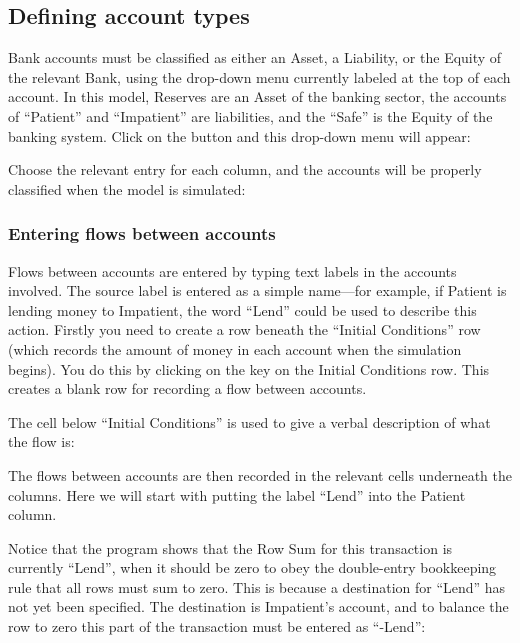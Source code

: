 \subsection{Defining account types}

Bank accounts must be classified as either an Asset, a Liability, or
the Equity of the relevant Bank, using the drop-down menu currently
labeled  at the top of each account. In
this model, Reserves are an Asset of the banking sector, the accounts
of ``Patient'' and ``Impatient'' are liabilities, and the ``Safe'' is
the Equity of the banking system. Click on the
 button and this drop-down menu will
appear:


Choose the relevant entry for each column, and the accounts will be properly classified when the model is simulated:


\subsubsection{Entering flows between accounts}


Flows between accounts are entered by typing text labels in the
accounts involved. The source label is entered as a simple name---for
example, if Patient is lending money to Impatient, the word ``Lend''
could be used to describe this action. Firstly you need to create a
row beneath the ``Initial Conditions'' row (which records the amount of
money in each account when the simulation begins). You do this by
clicking on the  key on the Initial Conditions row. This creates a
blank row for recording a flow between accounts.


The cell below ``Initial Conditions'' is used to give a verbal
description of what the flow is: 


The flows between accounts are then recorded in the relevant cells
underneath the columns. Here we will start with putting the label
``Lend'' into the Patient column. 


Notice that the program shows that the Row Sum for this transaction is
currently ``Lend'', when it should be zero to obey the double-entry
bookkeeping rule that all rows must sum to zero. This is because a
destination for ``Lend'' has not yet been specified. The destination
is Impatient's account, and to balance the row to zero this part of
the transaction must be entered as ``-Lend'': 

